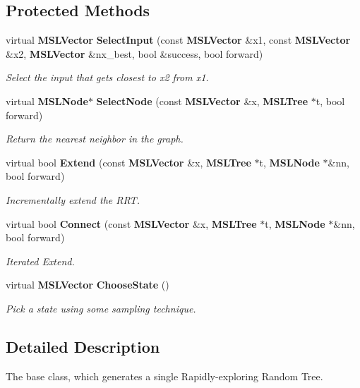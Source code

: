 \subsection*{Protected Methods}
\begin{CompactItemize}
\item 
virtual {\bf MSLVector} {\bf Select\-Input} (const {\bf MSLVector} \&x1, const {\bf MSLVector} \&x2, {\bf MSLVector} \&nx\_\-best, bool \&success, bool forward)
\begin{CompactList}\small\item\em Select the input that gets closest to x2 from x1.\item\end{CompactList}\item 
virtual {\bf MSLNode}$\ast$ {\bf Select\-Node} (const {\bf MSLVector} \&x, {\bf MSLTree} $\ast$t, bool forward)
\begin{CompactList}\small\item\em Return the nearest neighbor in the graph.\item\end{CompactList}\item 
virtual bool {\bf Extend} (const {\bf MSLVector} \&x, {\bf MSLTree} $\ast$t, {\bf MSLNode} $\ast$\&nn, bool forward)
\begin{CompactList}\small\item\em Incrementally extend the RRT.\item\end{CompactList}\item 
virtual bool {\bf Connect} (const {\bf MSLVector} \&x, {\bf MSLTree} $\ast$t, {\bf MSLNode} $\ast$\&nn, bool forward)
\begin{CompactList}\small\item\em Iterated Extend.\item\end{CompactList}\item 
virtual {\bf MSLVector} {\bf Choose\-State} ()
\begin{CompactList}\small\item\em Pick a state using some sampling technique.\item\end{CompactList}\end{CompactItemize}


\subsection{Detailed Description}
The base class, which generates a single Rapidly-exploring Random Tree.


